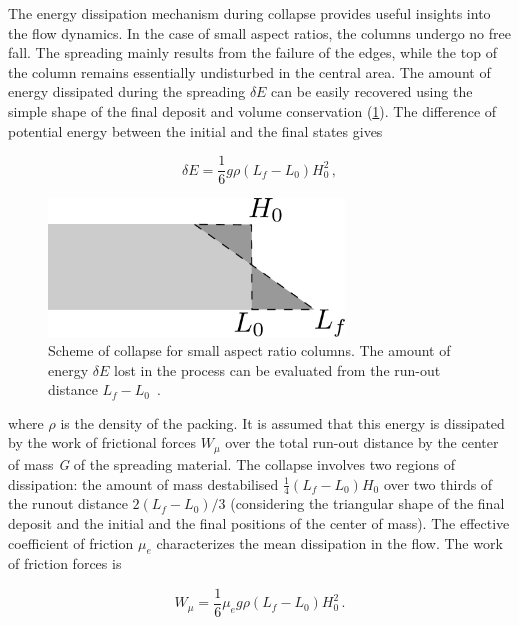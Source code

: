 The energy dissipation mechanism during collapse provides useful insights 
into the flow dynamics. In the case of small aspect ratios, the columns undergo 
no free fall. The spreading mainly results from the failure of the edges, while 
the top of the column remains essentially undisturbed in the central area. 
The amount of energy dissipated during the 
spreading $\delta E$ can be easily recovered using the simple shape of the 
final deposit and volume conservation (\cref{fig:volume_conservation}). The 
difference of potential energy between the initial and the final states gives

\begin{equation}
\delta E = \frac{1}{6} g \rho (L_f - L_0) H_0^2 \,,
\end{equation}

\begin{figure}
\centering
\includegraphics[width=0.7\textwidth]{volume_conservation}
\caption{Scheme of collapse for small aspect ratio columns. The amount of 
energy $\delta E$ lost in the process can be evaluated
from the run-out distance $L_f - L_0$~\citep{Staron2007a}.}
\label{fig:volume_conservation}
\end{figure}

where $\rho$ is the density of the packing. It is assumed that this energy is 
dissipated by the work of frictional forces $W_{\mu}$ over the total run-out 
distance by the center of mass \textit{G} of the spreading 
material. The collapse involves two regions of dissipation: the amount of mass 
destabilised $\frac{1}{4}(L_f - 
L_0) H_0$ over two thirds of the runout distance $2(L_f - L_0) / 3$ (considering
the triangular shape of the final deposit and the initial and the final 
positions of the center of mass). The effective coefficient of friction $\mu_e$ 
characterizes the mean dissipation in the flow. The work of friction forces is 

\begin{equation}
W_{\mu} = \frac{1}{6} \mu_e g \rho (L_f - L_0) H_0^2 \,.
\end{equation}

